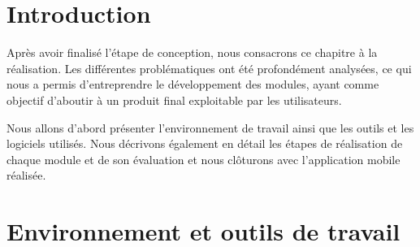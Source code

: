 
\newpage
\section{Introduction}
Après avoir finalisé l'étape de conception, nous consacrons ce chapitre à la réalisation. Les différentes problématiques ont été profondément analysées, ce qui nous a permis d'entreprendre le développement des modules, ayant comme objectif d'aboutir à un produit final exploitable par les utilisateurs.

Nous allons d'abord présenter l'environnement de travail ainsi que les outils et les logiciels utilisés. Nous décrivons également en détail les étapes de réalisation de chaque module et de son évaluation et nous clôturons avec l'application mobile réalisée.

\section{Environnement et outils de travail}
